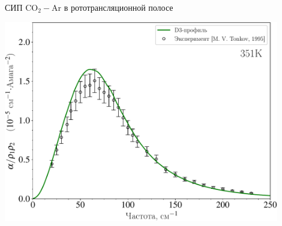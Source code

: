 \documentclass[10pt,usenames,pdf,hyperref={unicode},dvipsnames]{beamer}
\begin{document}
\begin{frame}{СИП CO$_2-$Ar в рототрансляционной полосе}
	\begin{center}
		\includegraphics[width=0.9\textwidth]{./pictures/351K_russian_legend-crop.pdf}
	\end{center}
\end{frame}
\end{document}
